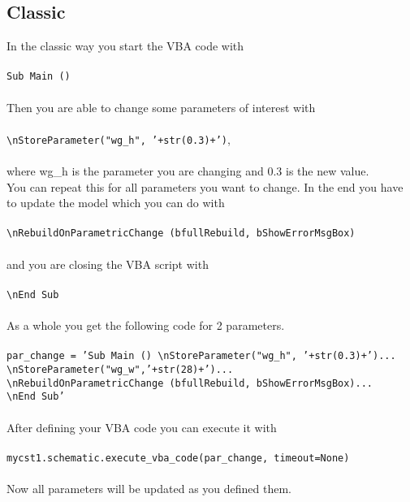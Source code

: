 \documentclass[12pt,accentcolor=tud2b, colorback, openany]{tudreport}
\begin{document}
	\subsection{Classic}
	In the classic way you start the VBA code with\\
	\\
	\texttt{Sub Main ()}\\
	\\
	Then you are able to change some parameters of interest with\\
	\\
	\texttt{\textbackslash nStoreParameter("wg\_h", '+str(0.3)+')},\\
	\\
	where wg\_h is the parameter you are changing and 0.3 is the new value.\\
	You can repeat this for all parameters you want to change. In the end you have to update the model which you can do with\\
	\\
	\texttt{\textbackslash nRebuildOnParametricChange (bfullRebuild, bShowErrorMsgBox)}\\
	\\
	and you are closing the VBA script with\\
	\\
	\texttt{\textbackslash nEnd Sub}\\
	\\
	As a whole you get the following code for 2 parameters.\\
	\\
	\texttt{par\_change = 'Sub Main () \textbackslash nStoreParameter("wg\_h", '+str(0.3)+')...\\
	\textbackslash nStoreParameter("wg\_w",'+str(28)+')...\\
	\textbackslash nRebuildOnParametricChange (bfullRebuild, bShowErrorMsgBox)...\\
	\textbackslash nEnd Sub'}\\
	\\
	After defining your VBA code you can execute it with\\
	\\
	\texttt{mycst1.schematic.execute\_vba\_code(par\_change, timeout=None)}\\
	\\
	Now all parameters will be updated as you defined them. 
\end{document}
